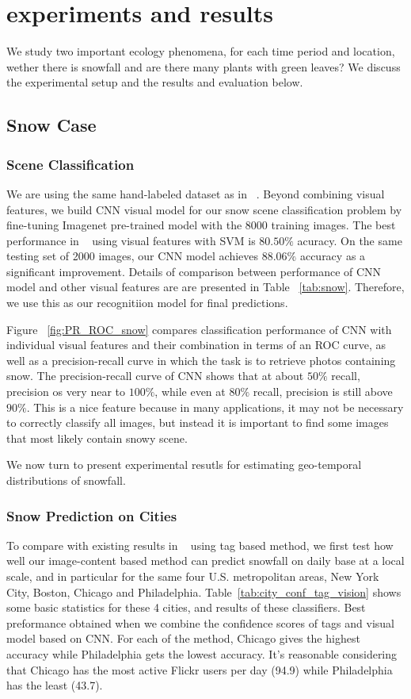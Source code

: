 \section{experiments and results}
We study two important ecology phenomena, for each time period and location, 
wether there is snowfall and are there many plants with green leaves? We discuss the experimental setup 
and the results and evaluation below.

\subsection{Snow Case}
\subsubsection{Scene Classification}
We are using the same hand-labeled dataset as in ~\cite{wang2013observing}.
Beyond combining visual features, 
we build CNN visual model for our snow scene classification problem 
by fine-tuning Imagenet pre-trained model with the 8000 training images. The best 
performance in ~\cite{wang2013observing} using visual features with SVM is $80.50\%$ acuracy.
On the same testing set of 2000 images, our CNN model achieves $88.06\%$ accuracy as a significant 
improvement. Details of comparison between performance of CNN model
 and other visual features are  are presented in Table ~\ref{tab:snow}. Therefore, we use this as our recognitiion model for final predictions.

Figure ~\ref{fig:PR_ROC_snow} compares classification performance of CNN with 
individual visual features and their combination in terms of an ROC curve, 
as well as a precision-recall curve in which the task is to retrieve photos containing snow.
The precision-recall curve of CNN shows that at about $50\%$ recall, precision os very near to $100\%$, 
while even at $80\%$ recall, precision is still above $90\%$. This is a nice feature because 
in many applications, it may not be necessary to correctly 
classify all images, but instead it is important to find some images that most likely contain snowy 
scene.

We now turn to present experimental resutls for estimating geo-temporal distributions of snowfall.

\subsubsection{Snow Prediction on Cities}
To compare with existing results in ~\cite{wang2013observing} using tag based method,
we first test how well our image-content based method can predict snowfall on daily base at a local scale, 
and in particular 
for the same four U.S. metropolitan areas, New York City, Boston, Chicago and Philadelphia. 
Table~\ref{tab:city_conf_tag_vision} 
shows some basic statistics for these 4 cities, and results of these classifiers. 
Best preformance obtained when we combine 
the confidence scores of tags and visual model based on CNN. For each of the method, 
Chicago gives the highest accuracy while Philadelphia gets the lowest accuracy. 
It's reasonable considering that Chicago has the most active Flickr users per
day (94.9) while Philadelphia has the least (43.7). 

